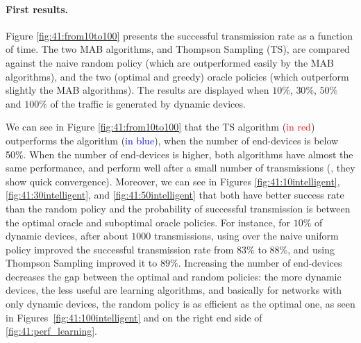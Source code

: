 \paragraph{First results.}

Figure \ref{fig:41:from10to100} presents the successful transmission rate as a function of time.
The two MAB algorithms, \UCB{} and Thompson Sampling (TS), are compared against the naive random policy (which are outperformed easily by the MAB algorithms), and the two (optimal and greedy) oracle policies (which outperform slightly the MAB algorithms).
The results are displayed when $10\%$, $30\%$, $50\%$ and $100\%$ of the traffic is generated by dynamic devices.


We can see in Figure \ref{fig:41:from10to100} that the TS algorithm (\textcolor{red}{in red}) outperforms the \UCB{} algorithm (\textcolor{blue}{in blue}), when the number of end-devices is below 50\%. When the number of end-devices is higher, both algorithms have almost the same performance, and perform well after a small number of transmissions (\ie, they show quick convergence).
Moreover, we can see in Figures \ref{fig:41:10intelligent}, \ref{fig:41:30intelligent}, and \ref{fig:41:50intelligent} that both have better success rate than the random policy and the probability of successful transmission is between the optimal oracle and suboptimal oracle policies.
For instance, for $10\%$ of dynamic devices, after about $1000$ transmissions, using \UCB{} over the naive uniform policy improved the successful transmission rate from $83\%$ to $88\%$, and using Thompson Sampling improved it to $89\%$.
Increasing the number of end-devices decreases the gap between the optimal and random policies: the more dynamic devices, the less useful are learning algorithms, and basically for networks with only dynamic devices, the random policy is as efficient as the optimal one, as seen in Figures~\ref{fig:41:100intelligent} and on the right end side of \ref{fig:41:perf_learning}.

